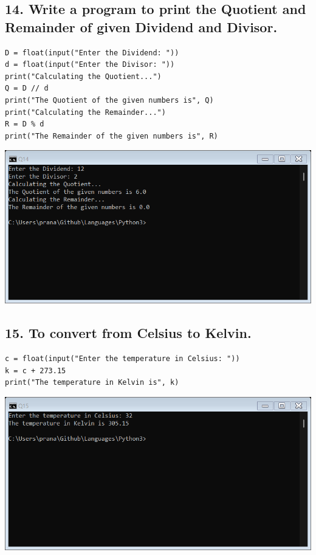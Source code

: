 \documentclass[12pt]{article}
\begin{document}
\subsection*{14. Write a program to print the Quotient and Remainder of given Dividend and Divisor.}
\begin{verbatim}
D = float(input("Enter the Dividend: "))
d = float(input("Enter the Divisor: "))
print("Calculating the Quotient...")
Q = D // d
print("The Quotient of the given numbers is", Q)
print("Calculating the Remainder...")
R = D % d
print("The Remainder of the given numbers is", R)
\end{verbatim}
\includegraphics[width=\linewidth]{images/14.png}

\subsection*{15. To convert from Celsius to Kelvin.}
\begin{verbatim}
c = float(input("Enter the temperature in Celsius: "))
k = c + 273.15
print("The temperature in Kelvin is", k)
\end{verbatim}
\includegraphics[width=\linewidth]{images/15.png}
\end{document}
